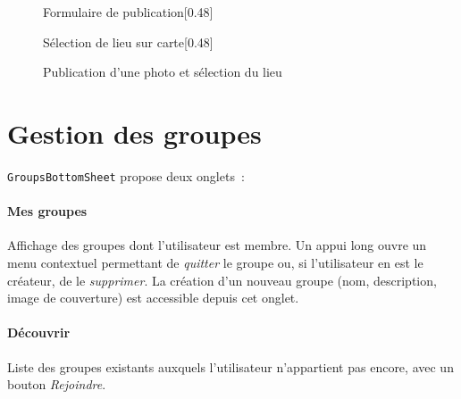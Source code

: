\documentclass[12pt, a4paper, openany]{report}
\begin{document}
\begin{figure}[H]
  \centering
  \begin{subcaptionbox}{Formulaire de publication\label{fig:publish_form}}[0.48\textwidth]
  \end{subcaptionbox}
  \hfill
  \begin{subcaptionbox}{Sélection de lieu sur carte\label{fig:map_picker}}[0.48\textwidth]
  \end{subcaptionbox}
  \caption{Publication d'une photo et sélection du lieu}
  \label{fig:publish}
\end{figure}

\section{Gestion des groupes}

\texttt{GroupsBottomSheet} propose deux onglets~:

\paragraph{Mes groupes}
Affichage des groupes dont l'utilisateur est membre. Un appui long ouvre un menu contextuel
permettant de \emph{quitter} le groupe ou, si l'utilisateur en est le créateur, de le
\emph{supprimer}. La création d'un nouveau groupe (nom, description, image de couverture)
est accessible depuis cet onglet.

\paragraph{Découvrir}
Liste des groupes existants auxquels l'utilisateur n'appartient pas encore, avec un bouton
\emph{Rejoindre}.
\end{document}

